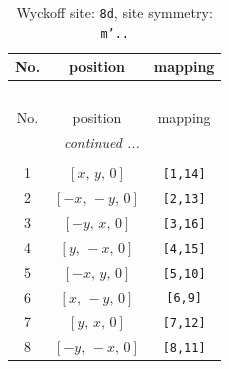 \documentclass[fleqn,8pt]{jsarticle}
\begin{document}
\renewcommand{\arraystretch}{1.2}
\begin{longtable}{ccc}
\caption{Wyckoff site: {\tt 8d}, site symmetry: {\tt m'..}}
 \\
 \hline \hline
No. & position & mapping \\ \hline \endfirsthead

\multicolumn{2}{l}{\tablename\ \thetable{}} \\
 \hline \hline
No. & position & mapping \\ \hline \endhead

 \hline \hline
\multicolumn{2}{r}{\footnotesize\it continued ...} \\ \endfoot

 \hline \hline
\multicolumn{2}{r}{} \\ \endlastfoot

1 & $\left[ x,\, y,\, 0 \right]$ & {\tt [1,14]} \\ \hline
2 & $\left[ - x,\, - y,\, 0 \right]$ & {\tt [2,13]} \\ \hline
3 & $\left[ - y,\, x,\, 0 \right]$ & {\tt [3,16]} \\ \hline
4 & $\left[ y,\, - x,\, 0 \right]$ & {\tt [4,15]} \\ \hline
5 & $\left[ - x,\, y,\, 0 \right]$ & {\tt [5,10]} \\ \hline
6 & $\left[ x,\, - y,\, 0 \right]$ & {\tt [6,9]} \\ \hline
7 & $\left[ y,\, x,\, 0 \right]$ & {\tt [7,12]} \\ \hline
8 & $\left[ - y,\, - x,\, 0 \right]$ & {\tt [8,11]} \\
\end{longtable}
\renewcommand{\arraystretch}{1.2}
\end{document}
